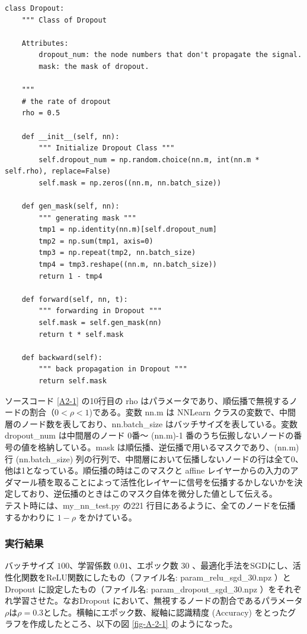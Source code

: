 \documentclass[a4paper,dvipdfmx]{jsarticle}
\begin{document}
\begin{lstlisting}[caption="クラス Dropout ",label=A2-1]
class Dropout:
    """ Class of Dropout

    Attributes:
        dropout_num: the node numbers that don't propagate the signal.
        mask: the mask of dropout.

    """
    # the rate of dropout
    rho = 0.5

    def __init__(self, nn):
        """ Initialize Dropout Class """
        self.dropout_num = np.random.choice(nn.m, int(nn.m * self.rho), replace=False)
        self.mask = np.zeros((nn.m, nn.batch_size))

    def gen_mask(self, nn):
        """ generating mask """
        tmp1 = np.identity(nn.m)[self.dropout_num]
        tmp2 = np.sum(tmp1, axis=0)
        tmp3 = np.repeat(tmp2, nn.batch_size)
        tmp4 = tmp3.reshape((nn.m, nn.batch_size))
        return 1 - tmp4

    def forward(self, nn, t):
        """ forwarding in Dropout """
        self.mask = self.gen_mask(nn)
        return t * self.mask

    def backward(self):
        """ back propagation in Dropout """
        return self.mask
\end{lstlisting}

ソースコード \ref{A2-1} の10行目の rho はパラメータであり、順伝播で無視するノードの割合（$ 0 < \rho < 1$)である。変数 nn.m は NNLearn クラスの変数で、中間層のノード数を表しており、nn.batch\_size はバッチサイズを表している。変数  dropout\_num は中間層のノード 0番〜 (nn.m)-1 番のうち伝搬しないノードの番号の値を格納している。mask は順伝播、逆伝播で用いるマスクであり、(nn.m) 行 
 (nn.batch\_size) 列の行列で、中間層において伝播しないノードの行は全て0、他は1となっている。順伝播の時はこのマスクと affine レイヤーからの入力のアダマール積を取ることによって活性化レイヤーに信号を伝播するかしないかを決定しており、逆伝播のときはこのマスク自体を微分した値として伝える。\\
 
 テスト時には、my\_nn\_test.py の221 行目にあるように、全てのノードを伝播するかわりに $1-\rho$ をかけている。
 
 \subsubsection*{実行結果}
 
バッチサイズ $100$、学習係数 $0.01$、エポック数 $30$ 、最適化手法をSGDにし、活性化関数をReLU関数にしたもの（ファイル名: param\_relu\_sgd\_30.npz ）とDropout に設定したもの（ファイル名: param\_dropout\_sgd\_30.npz ）をそれぞれ学習させた。なおDropout において、無視するノードの割合であるパラメータ$\rho$は$\rho = 0.3$とした。横軸にエポック数、縦軸に認識精度 (Accuracy) をとったグラフを作成したところ、以下の図 \ref{fig-A-2-1} のようになった。
\end{document}
